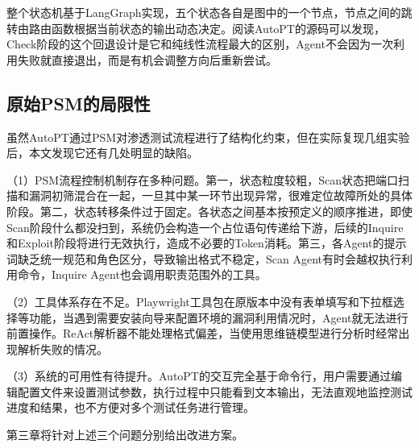 整个状态机基于LangGraph实现，五个状态各自是图中的一个节点，节点之间的跳转由路由函数根据当前状态的输出动态决定。阅读AutoPT的源码可以发现，Check阶段的这个回退设计是它和纯线性流程最大的区别，Agent不会因为一次利用失败就直接退出，而是有机会调整方向后重新尝试。

\subsection{原始PSM的局限性}

虽然AutoPT通过PSM对渗透测试流程进行了结构化约束，但在实际复现几组实验后，本文发现它还有几处明显的缺陷。

（1）PSM流程控制机制存在多种问题。第一，状态粒度较粗，Scan状态把端口扫描和漏洞初筛混合在一起，一旦其中某一环节出现异常，很难定位故障所处的具体阶段。第二，状态转移条件过于固定。各状态之间基本按预定义的顺序推进，即使Scan阶段什么都没扫到，系统仍会构造一个占位语句传递给下游，后续的Inquire和Exploit阶段将进行无效执行，造成不必要的Token消耗。第三，各Agent的提示词缺乏统一规范和角色区分，导致输出格式不稳定，Scan Agent有时会越权执行利用命令，Inquire Agent也会调用职责范围外的工具。

（2）工具体系存在不足。Playwright工具包在原版本中没有表单填写和下拉框选择等功能，当遇到需要安装向导来配置环境的漏洞利用情况时，Agent就无法进行前置操作。ReAct解析器不能处理格式偏差，当使用思维链模型进行分析时经常出现解析失败的情况。

（3）系统的可用性有待提升。AutoPT的交互完全基于命令行，用户需要通过编辑配置文件来设置测试参数，执行过程中只能看到文本输出，无法直观地监控测试进度和结果，也不方便对多个测试任务进行管理。

第三章将针对上述三个问题分别给出改进方案。

